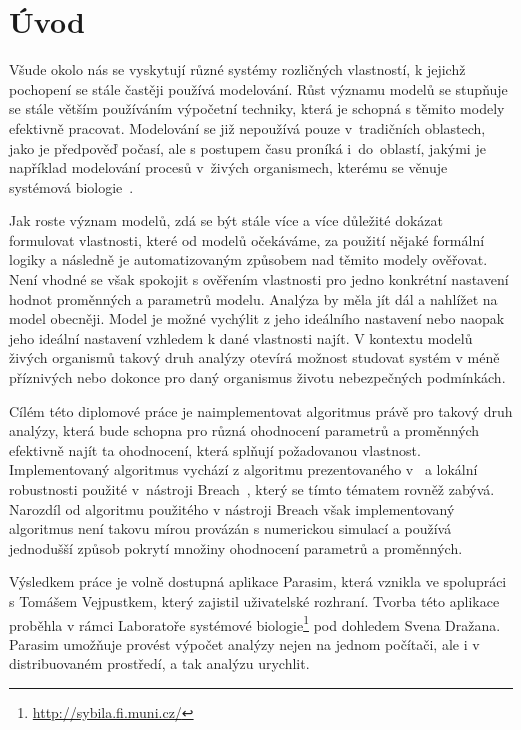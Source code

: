 \chapter{Úvod}\label{chapter:introduction}

Všude okolo nás se vyskytují různé systémy rozličných vlastností, k jejichž
pochopení se stále častěji používá modelování. Růst významu modelů se stupňuje
se stále větším používáním výpočetní techniky, která je schopná s těmito modely
efektivně pracovat. Modelování se již nepoužívá pouze v~tradičních oblastech, jako je
předpověď počasí, ale s postupem času proníká i~do~oblastí, jakými je například
modelování procesů v~živých organismech, kte\-ré\-mu se věnuje systémová biologie~\cite{westerhoff2005}.

Jak roste význam modelů, zdá se být stále více a více důležité dokázat formulovat
vlastnosti, které od modelů očekáváme, za použití nějaké for\-mál\-ní logiky a následně
je automatizovaným způsobem nad těmito modely o\-vě\-řo\-vat. Není vhodné se však spokojit s ověřením
vlastnosti pro jedno konkrétní nastavení hodnot proměnných a parametrů modelu. Analýza
by měla jít dál a nahlížet na model obecněji. Model je možné vychýlit z jeho ideálního
nastavení nebo naopak jeho ideální nastavení vzhledem k dané vlastnosti najít. V kontextu
modelů živých organismů takový druh analýzy otevírá možnost studovat systém v méně příznivých
nebo dokonce pro daný organismus životu nebezpečných podmínkách.

Cílém této diplomové práce je naimplementovat algoritmus právě pro takový druh analýzy,
která bude schopna pro různá ohodnocení parametrů a proměnných efektivně najít ta
ohodnocení, která splňují požadovanou vlastnost. Implementovaný algoritmus vychází z algoritmu
prezentovaného v~\cite{drazan2011} a lokální robustnosti použité v~nástroji Breach~\cite{donze2010breach},
který se tímto té\-ma\-tem rovněž zabývá. Narozdíl od algoritmu použitého v nástroji Breach však
implementovaný algoritmus není takovu mírou provázán s numerickou simulací a používá
jednodušší způsob pokrytí množiny ohodnocení parametrů a proměnných.

Výsledkem práce je volně dostupná aplikace Parasim, která vznikla ve spolupráci s Tomášem Vejpustkem,
který zajistil uživatelské rozhraní. Tvor\-ba této aplikace proběhla v rámci Laboratoře
systémové biologie\footnote{\url{http://sybila.fi.muni.cz/}} pod dohledem Svena Dražana.
Parasim umožňuje provést výpočet analýzy nejen na jednom počítači, ale i v distribuovaném
prostředí, a tak analýzu urychlit.


